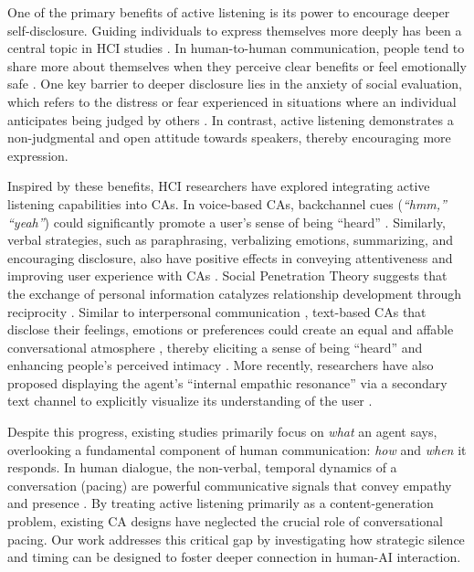One of the primary benefits of active listening is its power to encourage deeper self-disclosure. Guiding individuals to express themselves more deeply has been a central topic in HCI studies \cite{zhang2023tools}. In human-to-human communication, people tend to share more about themselves when they perceive clear benefits or feel emotionally safe \cite{hallam2017online, 10.1145/3613904.3642385,derlega2008does}. One key barrier to deeper disclosure lies in the anxiety of social evaluation, which refers to the distress or fear experienced in situations where an individual anticipates being judged by others \cite{derlaga1987self}. In contrast, active listening demonstrates a non-judgmental and open attitude towards speakers, thereby encouraging more expression. 

Inspired by these benefits, HCI researchers have explored integrating active listening capabilities into CAs. 
In voice-based CAs, backchannel cues (\textit{``hmm,''} \textit{``yeah''}) could significantly promote a user's sense of being ``heard'' \cite{10.1145/3555164, 10.1145/3313831.3376131, 10.1145/3708557.3716343}. Similarly, verbal strategies, such as paraphrasing, verbalizing emotions, summarizing, and encouraging disclosure, also have positive effects in conveying attentiveness and improving user experience with CAs \cite{10.1145/3313831.3376131}. Social Penetration Theory suggests that the exchange of personal information catalyzes relationship development through reciprocity \cite{altman1973social}. Similar to interpersonal communication \cite{nass2000machines}, text-based CAs that disclose their feelings, emotions or preferences could create an equal and affable conversational atmosphere \cite{meng2021emotional}, thereby eliciting a sense of being ``heard'' and enhancing people's perceived intimacy \cite{10.1145/3313831.3376175}. More recently, researchers have also proposed displaying the agent's ``internal empathic resonance'' via a secondary text channel to explicitly visualize its understanding of the user \cite{schmidmaier2025using}.

Despite this progress, existing studies primarily focus on \textit{what} an agent says, overlooking a fundamental component of human communication: \textit{how} and \textit{when} it responds. In human dialogue, the non-verbal, temporal dynamics of a conversation (pacing) are powerful communicative signals that convey empathy and presence \cite{bruneau1973communicative, weger2014relative}. By treating active listening primarily as a content-generation problem, existing CA designs have neglected the crucial role of conversational pacing. Our work addresses this critical gap by investigating how strategic silence and timing can be designed to foster deeper connection in human-AI interaction.


